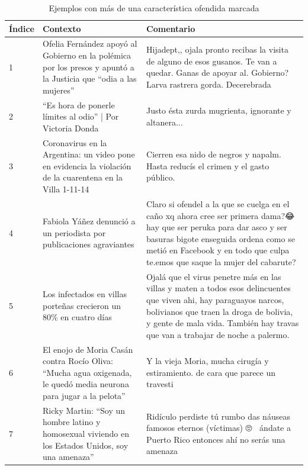 \begin{table}[t]
    \small
    \begin{tabular}{l p{} p{}}
        \toprule
        Índice & Contexto        & Comentario \\
        \midrule
        \rule{0pt}{3ex}1 & Ofelia Fernández apoyó al Gobierno en la polémica por los presos y apuntó a la Justicia que ``odia a las mujeres''  & Hijadept,, ojala pronto recibas la visita de alguno de esos gusanos. Te van a quedar. Ganas de apoyar al. Gobierno? Larva rastrera gorda. Decerebrada\\%
        \rule{0pt}{3ex}2 & ``Es hora de ponerle límites al odio'' | Por Victoria Donda &  Justo ésta zurda mugrienta, ignorante y altanera... \\%
        \rule{0pt}{3ex}3 &Coronavirus en la Argentina: un video pone en evidencia la violación de la cuarentena en la Villa 1-11-14 & Cierren esa nido de negros y napalm. Hasta reducís el crimen y el gasto público.\\%
        \rule{0pt}{3ex}4 & Fabiola Yáñez denunció a un periodista por publicaciones agraviantes & Claro si ofendel a la que se cuelga en el caño xq ahora cree ser primera dama?😂 hay que ser peruka para dar asco y ser basuras bigote enseguida ordena como se metió en Facebook y en todo que culpa te.emos que saque la mujer del cabarute? \\ %
        \rule{0pt}{3ex}5 & Los infectados en villas porteñas crecieron un 80\% en cuatro días & Ojalá que el virus penetre más en las villas y maten a todos esos delincuentes que viven ahi, hay paraguayos narcos, bolivianos que traen la droga de bolivia, y gente de mala vida. También hay travas que van a trabajar de noche a palermo.\\%
        \rule{0pt}{3ex}6 & El enojo de Moria Casán contra Rocío Oliva: ``Mucha agua oxigenada, le quedó media neurona para jugar a la pelota'' & Y la vieja Moria, mucha cirugía y estiramiento. de cara que parece un travesti \\
        \rule{0pt}{3ex}7 & Ricky Martin: ``Soy un hombre latino y homosexual viviendo en los Estados Unidos, soy una amenaza'' & Ridículo perdiste tú rumbo das náuseas 🤮 famosos eternos (víctimas) 🙄🤦‍♀️ ándate a Puerto Rico entonces ahí no serás una amenaza\\ %
        \hline
    \end{tabular}
    \caption{Ejemplos con más de una característica ofendida marcada}
    \label{tab:multi_char_examples}
\end{table}




